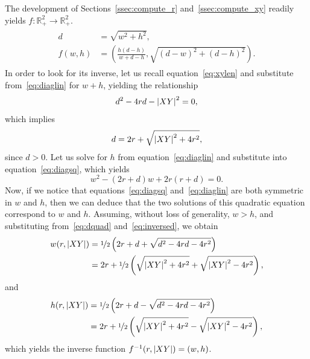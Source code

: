 The development of Sections~\ref{ssec:compute_r} and~\ref{ssec:compute_xy}
readily yields $f: \mathbb{R}_+^2 \rightarrow \mathbb{R}_+^2$.
%
\begin{align}
  \begin{split}
    d &= \sqrt{w^2 + h^2}, \\
    f(w,h) &= \left( \frac{h(d-h)}{w+d-h}, \sqrt{(d-w)^2 + (d-h)^2} \right).
  \end{split}
  \label{eq:f}
\end{align}
%
In order to look for its inverse, let us recall equation~\eqref{eq:xylen} and
substitute from~\eqref{eq:diaglin} for $w+h$, yielding the relationship 
\begin{equation} 
 d^2 - 4rd - \left|{XY}\right|^2 = 0, 
 \label{eq:dquad}
\end{equation}
%
which implies 
%
\begin{equation}
  d = 2r + \sqrt{\left|{XY}\right|^2 + 4r^2}, 
  \label{eq:inversed}
\end{equation}
%
since $d > 0$. Let us solve for $h$ from equation~\eqref{eq:diaglin} and
substitute into equation~\eqref{eq:diagsq}, which yields \[ w^2 - (2r+d)w +
2r(r+d) = 0. \] Now, if we notice that equations~\eqref{eq:diagsq}
and~\eqref{eq:diaglin} are both symmetric in $w$ and $h$, then we can deduce
that the two solutions of this quadratic equation correspond to $w$ and $h$.
Assuming, without loss of generality, $w > h$, and substituting
from~\eqref{eq:dquad} and~\eqref{eq:inversed}, we obtain 
%
\begin{align*}
  w(r,\left|{XY}\right|) &= \nicefrac{1}{2}\left(2r+d + \sqrt{d^2 - 4rd - 4r^2} \right) \\ 
    &= 2r + \nicefrac{1}{2} \left( \sqrt{\left|{XY}\right|^2 + 4r^2} + \sqrt{\left|{XY}\right|^2 -
4r^2} \right),
\end{align*}
%
and 
%
\begin{align*}
  h(r,\left|{XY}\right|) &= \nicefrac{1}{2}\left(2r+d - \sqrt{d^2 - 4rd - 4r^2} \right) \\ 
    &= 2r + \nicefrac{1}{2} \left( \sqrt{\left|{XY}\right|^2 + 4r^2} - \sqrt{\left|{XY}\right|^2 -
4r^2} \right),
\end{align*}
%
which yields the inverse function $f^{-1}(r,\left|{XY}\right|) = (w,h)$.
